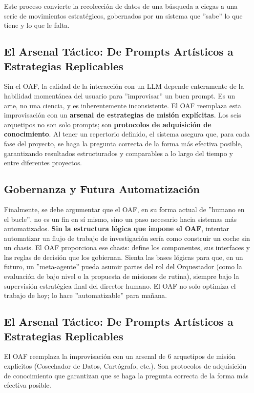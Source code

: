 \documentclass[11pt, a4paper]{article}
\begin{document}
Este proceso convierte la recolección de datos de una búsqueda a ciegas a una serie de movimientos estratégicos, gobernados por un sistema que ''sabe'' lo que tiene y lo que le falta.

\subsection{El Arsenal Táctico: De Prompts Artísticos a Estrategias Replicables}
\label{sec:metodologia_arsenal}

Sin el OAF, la calidad de la interacción con un LLM depende enteramente de la habilidad momentánea del usuario para ''improvisar'' un buen prompt. Es un arte, no una ciencia, y es inherentemente inconsistente. El OAF reemplaza esta improvisación con un \textbf{arsenal de estrategias de misión explícitas}. Los seis arquetipos no son solo prompts; son \textbf{protocolos de adquisición de conocimiento}. Al tener un repertorio definido, el sistema asegura que, para cada fase del proyecto, se haga la pregunta correcta de la forma más efectiva posible, garantizando resultados estructurados y comparables a lo largo del tiempo y entre diferentes proyectos.

\subsection{Gobernanza y Futura Automatización}
\label{sec:metodologia_gobernanza}

Finalmente, se debe argumentar que el OAF, en su forma actual de ''humano en el bucle'', no es un fin en sí mismo, sino un paso necesario hacia sistemas más automatizados. \textbf{Sin la estructura lógica que impone el OAF}, intentar automatizar un flujo de trabajo de investigación sería como construir un coche sin un chasis. El OAF proporciona ese chasis: define los componentes, sus interfaces y las reglas de decisión que los gobiernan. Sienta las bases lógicas para que, en un futuro, un ''meta-agente'' pueda asumir partes del rol del Orquestador (como la evaluación de bajo nivel o la propuesta de misiones de rutina), siempre bajo la supervisión estratégica final del director humano. El OAF no solo optimiza el trabajo de hoy; lo hace ''automatizable'' para mañana.

\subsection{El Arsenal Táctico: De Prompts Artísticos a Estrategias Replicables}
El OAF reemplaza la improvisación con un arsenal de 6 arquetipos de misión explícitos (Cosechador de Datos, Cartógrafo, etc.). Son protocolos de adquisición de conocimiento que garantizan que se haga la pregunta correcta de la forma más efectiva posible.
\end{document}
